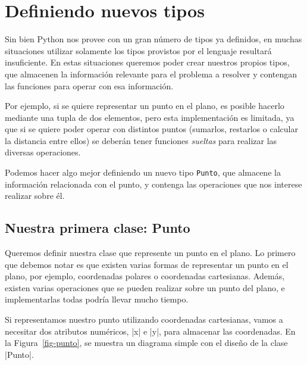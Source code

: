 \section{Definiendo nuevos tipos}

Sin bien Python nos provee con un gran número de tipos ya definidos, en
muchas situaciones utilizar solamente los tipos provistos por el lenguaje
resultará insuficiente.  En estas situaciones queremos poder crear nuestros
propios tipos, que almacenen la información relevante para el problema a
resolver y contengan las funciones para operar con esa información.

Por ejemplo, si se quiere representar un punto en el plano, es posible
hacerlo mediante una tupla de dos elementos, pero esta implementación es
limitada, ya que si se quiere poder operar con distintos puntos (sumarlos,
restarlos o calcular la distancia entre ellos) se deberán tener funciones
\emph{sueltas} para realizar las diversas operaciones.

Podemos hacer algo mejor definiendo un nuevo tipo \lstinline!Punto!, que almacene
la información relacionada con el punto, y contenga las operaciones que nos
interese realizar sobre él.

\subsection{Nuestra primera clase: Punto}

Queremos definir nuestra clase que represente un punto en el plano.
Lo primero que debemos notar es que existen varias formas de representar un
punto en el plano, por ejemplo, coordenadas polares o coordenadas
cartesianas.
Además, existen varias operaciones que se pueden realizar sobre un punto
del plano, e implementarlas todas podría llevar mucho tiempo.

Si representamos nuestro punto utilizando coordenadas cartesianas,
vamos a necesitar dos atributos numéricos, |x| e |y|, para almacenar las
coordenadas. En la Figura~\ref{fig-punto}, se muestra un diagrama simple con el
diseño de la clase |Punto|.


